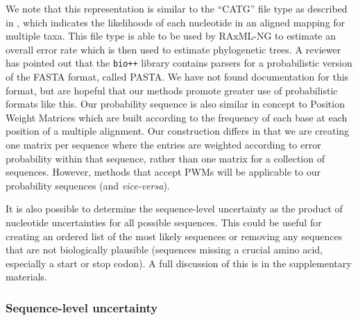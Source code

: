 \documentclass[12pt]{article}
\begin{document}
We note that this representation is similar to the ``CATG'' file type as described in \cite{kozlov}, which indicates the likelihoods of each nucleotide in an aligned mapping for multiple taxa. 
This file type is able to be used by RAxML-NG to estimate an overall error rate which is then used to estimate phylogenetic trees.
A reviewer has pointed out that the \texttt{bio++} library contains parsers for a probabilistic version of the FASTA format, called PASTA.
We have not found documentation for this format, but are hopeful that our methods promote greater use of probabilistic formats like this.
Our probability sequence is also similar in concept to Position Weight Matrices \cite[PWMs, ][]{stormoUsePerceptronAlgorithm1982} which are built according to the frequency of each base at each position of a multiple alignment. 
Our construction differs in that we are creating one matrix per sequence where the entries are weighted according to error probability within that sequence, rather than one matrix for a collection of sequences. 
However, methods that accept PWMs will be applicable to our probability sequences (and \emph{vice-versa}).

It is also possible to determine the sequence-level uncertainty as the product of nucleotide uncertainties for all possible sequences.
This could be useful for creating an ordered list of the most likely sequences or removing any sequences that are not biologically plausible (\eg sequences missing a crucial amino acid, especially a start or stop codon).
A full discussion of this is in the supplementary materials.



\subsubsection{Sequence-level uncertainty}
\end{document}

